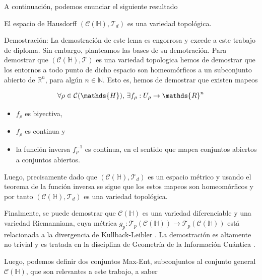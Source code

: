 \documentclass{report} %
\numberwithin{equation}{section}
\begin{document}
A continuación, podemos enunciar el siguiente resultado 

\begin{tcolorbox}[colback=red!5!white, colframe=red!50!black, title= Topología de $\mathcal{C}(\mathds{H})$]

El espacio de Hausdorff $(\mathcal{C}(\mathds{H}), \mathcal{T}_d)$ es una variedad topológica.
\end{tcolorbox}
\begin{tcolorbox}
Demostración: La demostración de este lema es engorrosa y excede a este trabajo de diploma. Sin embargo, planteamos las bases de su demotración. Para demostrar que $(\mathcal{C}(\mathds{H}), \mathcal{T})$ es una variedad topologica hemos de demostrar que los entornos a todo punto de dicho espacio son homeomórficos a un subconjunto abierto de $\mathds{R}^{n}$, para algún $n \in \mathds{N}$. Esto es, hemos de demostrar que existen mapeos

$$
\forall \rho \in \mathcal{C}(\mathds{H})\textnormal{, } \exists f_\rho : U_\rho \rightarrow \mathds{R}^{n} 
$$

\begin{itemize}
    \item $f_\rho$ es biyectiva,  
    \item $f_\rho$ es continua y 
    \item la función inversa  $f_\rho^{-1}$ es continua, en el sentido que mapea conjuntos abiertos a conjuntos abiertos. 
\end{itemize}

Luego, precisamente dado que $(\mathcal{C}(\mathds{H}), \mathcal{T}_d)$ es un espacio métrico y usando el teorema de la función inversa \cite{munkres} se sigue que los estos mapeos son homeomórficos y por tanto $(\mathcal{C}(\mathds{H}), \mathcal{T}_d)$ es una variedad topológica.
\end{tcolorbox}

Finalmente, se puede demostrar que $\mathcal{C}(\mathds{H})$ es una variedad diferenciable y una variedad Riemanniana, cuya métrica $g_p: \mathcal{T}_p (\mathcal{C}(\mathds{H})) \rightarrow \mathcal{T}_p (\mathcal{C}(\mathds{H}))$ está relacionada a la divergencia de Kullback-Leibler \cite{Portesi-ECI34, QITGeometry, NakaharaM}. La demostración es altamente no trivial y es tratada en la disciplina de Geometría de la Información Cuántica \cite{Portesi-ECI34, QITGeometry}.

Luego, podemos definir dos conjuntos Max-Ent, subconjuntos al conjunto general $\mathcal{C}(\mathds{H})$, que son relevantes a este trabajo, a saber
\end{document}
